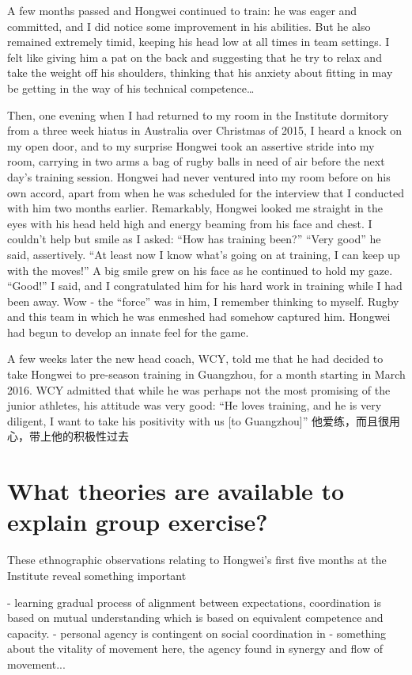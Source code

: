 A few months passed and Hongwei continued to train: he was eager and committed, and I did notice some improvement in his abilities. But he also remained extremely timid, keeping his head low at all times in team settings.  I felt like giving him a pat on the back and suggesting that he try to relax and take the weight off his shoulders, thinking that his anxiety about fitting in may be getting in the way of his technical competence…

Then, one evening when I had returned to my room in the Institute dormitory from a three week hiatus in Australia over Christmas of 2015, I heard a knock on my open door, and to my surprise Hongwei took an assertive stride into my room, carrying in two arms a bag of rugby balls in need of air before the next day's training session.  Hongwei had never ventured into my room before on his own accord, apart from when he was scheduled for the interview that I conducted with him two months earlier.  Remarkably, Hongwei looked me straight in the eyes with his head held high and energy beaming from his face and chest.  I couldn’t help but smile as I asked: ``How has training been?''
``Very good'' he said, assertively.  ``At least now I know what’s going on at training, I can keep up with the moves!''  A big smile grew on his face as he continued to hold my gaze.  ``Good!'' I said, and I congratulated him for his hard work in training while I had been away. Wow -  the ``force'' was in him, I remember thinking to myself.  Rugby and this team in which he was enmeshed had somehow captured him.  Hongwei had begun to develop an innate feel for the game.

A few weeks later the new head coach, WCY, told me that he had decided to take Hongwei to pre-season training in Guangzhou, for a month starting in March 2016.  WCY admitted that while he was perhaps not the most promising of the junior athletes, his attitude was very good: ``He loves training, and he is very diligent, I want to take his positivity with us [to Guangzhou]'' 他爱练，而且很用心，带上他的积极性过去


\section{What theories are available to explain group exercise?}


These ethnographic observations relating to Hongwei's first five months at the Institute reveal something important

- learning gradual process of alignment between expectations, coordination is based on mutual understanding which is based on equivalent competence and capacity.
- personal agency is contingent on social coordination in
- something about the vitality of movement here, the agency found in synergy and flow of movement...

